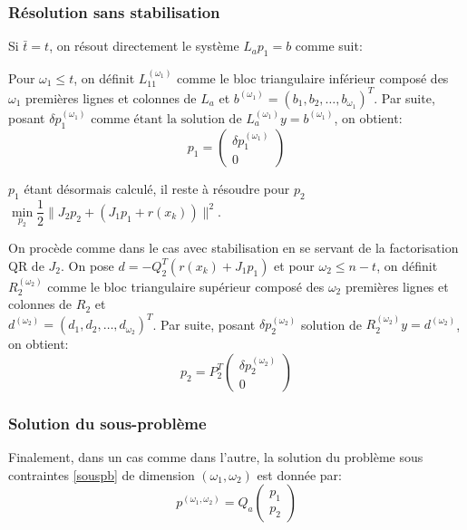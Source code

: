 \documentclass[a4paper,11pt]{article}
\numberwithin{equation}{section}
\begin{document}
\subsubsection{Résolution sans stabilisation} \label{resolutionsstab}

Si $\bar{t}=t$, on résout directement le système $L_{a}p_{1}=b$ comme suit:

Pour $\omega_{1} \leq t$, on définit $L_{11}^{(\omega_{1})}$ comme le bloc triangulaire inférieur composé des $\omega_{1}$ premières lignes et colonnes de $L_{a}$ et $b^{(\omega_{1})}= (b_1, b_2, \ldots, b_{\omega_{1}})^T$. Par suite, posant $\delta p_1^{(\omega_{1})} \text{ comme étant la solution de } L_{a}^{(\omega_{1})}y = b^{(\omega_{1})}$, on obtient:
\begin{equation} \label{calculp1}
p_1 = \begin{pmatrix} \delta p_1^{(\omega_{1})} \\ 0 \end{pmatrix}
\end{equation}

$p_1$ étant désormais calculé, il reste à résoudre pour $p_2$ $\underset{p_2}{\min} \dfrac{1}{2}\|J_2p_2 + (J_1p_1 + r(x_{k}))\|^2$. 

On procède comme dans le cas avec stabilisation en se servant de la factorisation QR de $J_2$.
On pose $d = -Q_2^T(r(x_{k}) + J_1p_1)$ et pour $\omega_{2} \leq n-t$, on définit $R_{2}^{(\omega_{2} )}$ comme le bloc triangulaire supérieur composé des $\omega_{2}$ premières lignes et colonnes de $R_{2}$ et \\ $d^{(\omega_{2})} = (d_1, d_2, \ldots, d_{\omega_{2}})^T$.
Par suite, posant $\delta p_2^{(\omega_{2})}$ solution de $R_{2}^{(\omega_{2})}y =d^{(\omega_{2})}$, on obtient:
\begin{equation} \label{calculp2}
p_2 = P_2^T\begin{pmatrix} \delta p_2^{(\omega_{2})} \\ 0 \end{pmatrix}
\end{equation}

\subsubsection{Solution du sous-problème}
Finalement, dans un cas comme dans l'autre, la solution du problème sous contraintes \ref{souspb} de dimension $(\omega_{1}, \omega_{2})$ est donnée par: 
\begin{equation}
{p^{(\omega_{1},\omega_{2})} = Q_{a} \begin{pmatrix} p_1 \\ p_2 \end{pmatrix}}
\end{equation}
\end{document}
